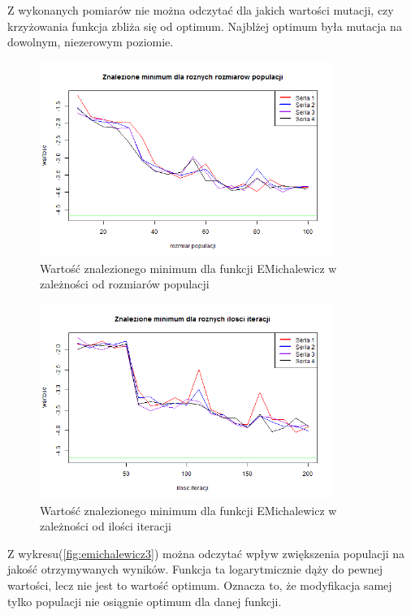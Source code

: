\documentclass[11pt, a4paper]{article}
\newcommand{\fbi}{\leavevmode{\parindent=1em\indent}}
\begin{document}
\fbi
Z wykonanych pomiarów nie można odczytać dla jakich wartości mutacji, czy krzyżowania funkcja zbliża się od optimum. Najblżej optimum była mutacja na dowolnym, niezerowym poziomie.

\begin{figure}[H]
	\begin{center}
		\includegraphics[width=0.85\textwidth]{./assets/EMichalewicz4.png}
		\caption{Wartość znalezionego minimum dla funkcji EMichalewicz w zależności od rozmiarów populacji}
		\label{fig:emichalewicz4}
	\end{center}
\end{figure}


\begin{figure}[H]
	\begin{center}
		\includegraphics[width=0.85\textwidth]{./assets/EMichalewicz5.png}
		\caption{Wartość znalezionego minimum dla funkcji EMichalewicz w zależności od ilości iteracji}
		\label{fig:emichalewicz5}
	\end{center}
\end{figure}

\fbi
Z wykresu(\ref{fig:emichalewicz3}) można odczytać wpływ zwiększenia populacji na jakość otrzymywanych wyników. Funkcja ta logarytmicznie dąży do pewnej wartości, lecz nie jest to wartość optimum. Oznacza to, że modyfikacja samej tylko populacji nie osiągnie optimum dla danej funkcji.
\end{document}
